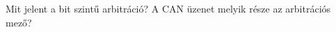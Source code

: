 \begin{example}

Mit jelent a bit szintű arbitráció? A CAN üzenet melyik része az arbitrációs mező?

\tcbline
\vspace{1mm}

\solution

\end{example}